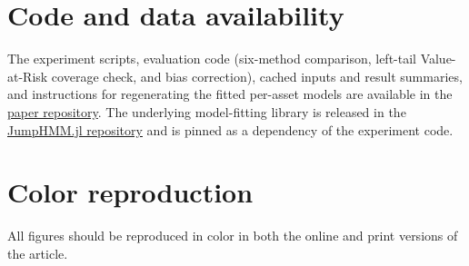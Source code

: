\documentclass[preprint,authoryear]{elsarticle}
\begin{document}
\section*{Code and data availability}
The experiment scripts, evaluation code (six-method comparison,
left-tail Value-at-Risk coverage check, and bias correction), cached
inputs and result summaries, and instructions for regenerating the
fitted per-asset models are available in the
\href{https://github.com/varnerlab/HMM-w-jumps-paper}{paper repository}.
The underlying model-fitting library is released in the
\href{https://github.com/varnerlab/JumpHMM.jl}{JumpHMM.jl repository}
and is pinned as a dependency of the experiment code.

\section*{Color reproduction}
All figures should be reproduced in color in both the online and print
versions of the article.
\end{document}
